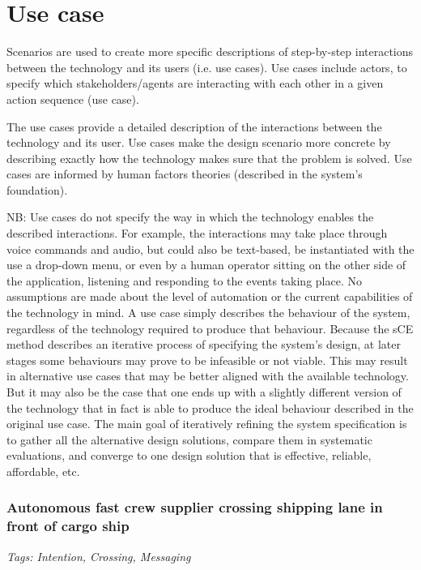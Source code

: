 \section{Use case}
Scenarios are used to create more specific descriptions of step-by-step interactions between the technology and its users (i.e. use cases). Use cases include actors, to specify which stakeholders/agents are interacting with each other in a given action sequence (use case).

The use cases provide a detailed description of the interactions between the technology and its user. Use cases make the design scenario more concrete by describing exactly how the technology makes sure that the problem is solved. Use cases are informed by human factors theories (described in the system’s foundation).

NB: Use cases do not specify the way in which the technology enables the described interactions. For example, the interactions may take place through voice commands and audio, but could also be text-based, be instantiated with the use a drop-down menu, or even by a human operator sitting on the other side of the application, listening and responding to the events taking place. No assumptions are made about the level of automation or the current capabilities of the technology in mind. A use case simply describes the behaviour of the system, regardless of the technology required to produce that behaviour. Because the sCE method describes an iterative process of specifying the system’s design, at later stages some behaviours may prove to be infeasible or not viable. This may result in alternative use cases that may be better aligned with the available technology. But it may also be the case that one ends up with a slightly different version of the technology that in fact is able to produce the ideal behaviour described in the original use case. The main goal of iteratively refining the system specification is to gather all the alternative design solutions, compare them in systematic evaluations, and converge to one design solution that is effective, reliable, affordable, etc.

\subsubsection{Autonomous fast crew supplier crossing shipping lane in front of cargo ship}

\emph{Tags: Intention, Crossing, Messaging}

